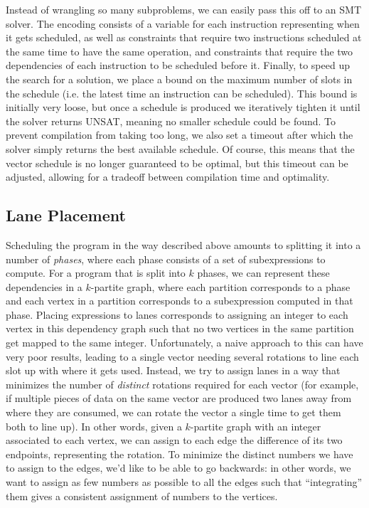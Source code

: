 Instead of wrangling so many subproblems, we can easily pass this off to an SMT solver.
The encoding consists of a variable for each instruction representing when it gets scheduled, as well as constraints that require two instructions scheduled at the same time to have the same operation, and constraints that require the two dependencies of each instruction to be scheduled before it.
Finally, to speed up the search for a solution, we place a bound on the maximum number of slots in the schedule (i.e. the latest time an instruction can be scheduled).
This bound is initially very loose, but once a schedule is produced we iteratively tighten it until the solver returns UNSAT, meaning no smaller schedule could be found. 
To prevent compilation from taking too long, we also set a timeout after which the solver simply returns the best available schedule.
Of course, this means that the vector schedule is no longer guaranteed to be optimal, but this timeout can be adjusted, allowing for a tradeoff between compilation time and optimality.

\subsection{Lane Placement}  
Scheduling the program in the way described above amounts to splitting it into a number of {\em phases}, where each phase consists of a set of subexpressions to compute.
For a program that is split into $k$ phases, we can represent these dependencies in a $k$-partite graph, where each partition corresponds to a phase and each vertex in a partition corresponds to a subexpression computed in that phase.
Placing expressions to lanes corresponds to assigning an integer to each vertex in this dependency graph such that no two vertices in the same partition get mapped to the same integer.
Unfortunately, a naive approach to this can have very poor results, leading to a single vector needing several rotations to line each slot up with where it gets used.
Instead, we try to assign lanes in a way that minimizes the number of {\em distinct} rotations required for each vector (for example, if multiple pieces of data on the same vector are produced two lanes away from where they are consumed, we can rotate the vector a single time to get them both to line up).
In other words, given a $k$-partite graph with an integer associated to each vertex, we can assign to each edge the difference of its two endpoints, representing the rotation. 
To minimize the distinct numbers we have to assign to the edges, we'd like to be able to go backwards: in other words, we want to assign as few numbers as possible to all the edges such that ``integrating'' them gives a consistent assignment of numbers to the vertices.

